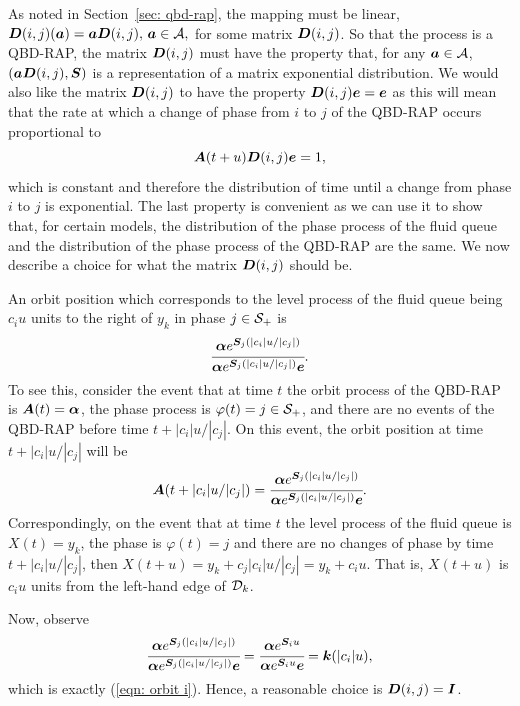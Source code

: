 As noted in Section~\ref{sec: qbd-rap}, the mapping must be linear, 
\(\boldsymbol D(i,j)(\boldsymbol a) = \boldsymbol a \boldsymbol D(i,j),\, \boldsymbol a \in\mathcal A,\)
for some matrix \(\boldsymbol D(i,j)\). So that the process is a QBD-RAP, the matrix \(\boldsymbol D(i,j)\) must have the property that, for any \(\boldsymbol a\in\mathcal A\), \((\boldsymbol a\boldsymbol D(i,j), \boldsymbol S)\) is a representation of a matrix exponential distribution. We would also like the matrix \(\boldsymbol D(i,j)\) to have the property \(\boldsymbol D(i,j) \boldsymbol e = \boldsymbol e\) as this will mean that the rate at which a change of phase from \(i\) to \(j\) of the QBD-RAP occurs proportional to 
\[\boldsymbol A(t+u) \boldsymbol D(i,j)\boldsymbol e = 1,\]
which is constant and therefore the distribution of time until a change from phase \(i\) to \(j\) is exponential. The last property is convenient as we can use it to show that, for certain models, the distribution of the phase process of the fluid queue and the distribution of the phase process of the QBD-RAP are the same. We now describe a choice for what the matrix \(\boldsymbol D(i,j)\) should be. 

An orbit position which corresponds to the level process of the fluid queue being \(c_iu\) units to the right of \(y_k\) in phase \(j\in\mathcal{S}_+\) is 
\[\cfrac{\boldsymbol \alpha e^{\boldsymbol S_j (|c_i|u/|c_j|)}}{\boldsymbol \alpha e^{\boldsymbol S_j (|c_i|u/|c_j|)}\boldsymbol e}.\] 
To see this, consider the event that at time \(t\) the orbit process of the QBD-RAP is \(\boldsymbol A(t) = \boldsymbol \alpha\), the phase process is \(\varphi(t) = j\in\mathcal{S}_+\), and there are no events of the QBD-RAP before time \(t+|c_i|u/|c_j|\). On this event, the orbit position at time \(t+|c_i|u/|c_j|\) will be 
\[\displaystyle \boldsymbol A(t+|c_i|u/|c_j|) = \cfrac{\boldsymbol \alpha e^{\boldsymbol S_j (|c_i|u/|c_j|)}}{\boldsymbol \alpha e^{\boldsymbol S_j (|c_i|u/|c_j|)}\boldsymbol e}.\] 
Correspondingly, on the event that at time \(t\) the level process of the fluid queue is \(X(t)=y_{k}\), the phase is \(\varphi(t)=j\) and there are no changes of phase by time \(t+|c_i|u/|c_j|\), then \(X(t+u)=y_{k}+c_j|c_i|u/|c_j| = y_k+c_iu\). That is, \(X(t+u)\) is \(c_iu\) units from the left-hand edge of \(\mathcal{D}_k\). 

Now, observe 
\[\cfrac{\boldsymbol \alpha e^{\boldsymbol S_j (|c_i|u/|c_j|)}}{\boldsymbol \alpha e^{\boldsymbol S_j (|c_i|u/|c_j|)}\boldsymbol e} = \cfrac{\boldsymbol \alpha e^{\boldsymbol S_iu}}{\boldsymbol \alpha e^{\boldsymbol S_i u}\boldsymbol e} = \boldsymbol k(|c_i|u),\] 
which is exactly (\ref{eqn: orbit i}). Hence, a reasonable choice is \(\boldsymbol D(i,j)=\boldsymbol I\). 

